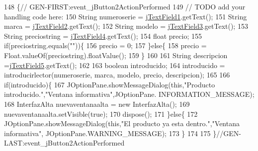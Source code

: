 \begin{DoxyCode}
148                                                                          \{\textcolor{comment}{//
      GEN-FIRST:event\_jButton2ActionPerformed}
149         \textcolor{comment}{// TODO add your handling code here:}
150         String numeroserie = \mbox{\hyperlink{class_interfaz_package_1_1_alta_lectores_ac08649a21b3eae20582e25d3fb7a1ed9}{jTextField1}}.getText();
151         String marca = \mbox{\hyperlink{class_interfaz_package_1_1_alta_lectores_a3f30dbff470e9749421774f5da8d8833}{jTextField2}}.getText();
152         String modelo = \mbox{\hyperlink{class_interfaz_package_1_1_alta_lectores_a1043b2ff62e3dcae79fb652d7891a131}{jTextField3}}.getText();
153         String preciostring = \mbox{\hyperlink{class_interfaz_package_1_1_alta_lectores_a933106873681982ae326743f58efd3d5}{jTextField4}}.getText();
154         \textcolor{keywordtype}{float} precio;
155         \textcolor{keywordflow}{if}(preciostring.equals(\textcolor{stringliteral}{""}))\{
156             precio = 0;
157         \}\textcolor{keywordflow}{else}\{
158         precio = Float.valueOf(preciostring).floatValue();
159         \}
160         
161         String descripcion =\mbox{\hyperlink{class_interfaz_package_1_1_alta_lectores_a8486f57ea492fe17d177c837d057d73e}{jTextField5}}.getText();
162         
163         \textcolor{keywordtype}{boolean} introducido;
164         introducido = introducirlector(numeroserie, marca, modelo, precio, descripcion);
165         
166         \textcolor{keywordflow}{if}(introducido)\{
167             JOptionPane.showMessageDialog(\textcolor{keyword}{this},\textcolor{stringliteral}{"Producto introducido."},\textcolor{stringliteral}{"Ventana informativa"},JOptionPane.
      INFORMATION\_MESSAGE);
168             InterfazAlta nuevaventanaalta = \textcolor{keyword}{new} InterfazAlta();
169             nuevaventanaalta.setVisible(\textcolor{keyword}{true});
170             dispose();
171         \}\textcolor{keywordflow}{else}\{
172             JOptionPane.showMessageDialog(\textcolor{keyword}{this},\textcolor{stringliteral}{"El producto ya esta dentro."},\textcolor{stringliteral}{"Ventana informativa"},
      JOptionPane.WARNING\_MESSAGE);
173         \}
174         
175     \}\textcolor{comment}{//GEN-LAST:event\_jButton2ActionPerformed}
\end{DoxyCode}
\mbox{\label{class_interfaz_package_1_1_alta_lectores_a26397a39d8852d63d6e04a40db326308}} 
